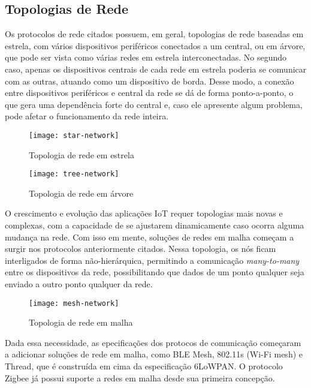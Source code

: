\documentclass[../monografia.tex]{subfiles}
\begin{document}
 
\subsection{Topologias de Rede}

Os protocolos de rede citados possuem, em geral, topologias de rede baseadas em estrela, com vários dispositivos periféricos conectados a um central, ou em árvore, que pode ser vista como várias redes em estrela interconectadas. No segundo caso, apenas os dispositivos centrais de cada rede em estrela poderia se comunicar com as outras, atuando como um dispositivo de borda. Desse modo, a conexão entre dispositivos periféricos e central da rede se dá de forma ponto-a-ponto, o que gera uma dependência forte do central e, caso ele apresente algum problema, pode afetar o funcionamento da rede inteira.

\begin{figure}[h!]
\centering
\begin{minipage}{.5\textwidth}
	\centering	
	\texttt{[image: star-network]}
	\caption{Topologia de rede em estrela}
	\label{fig:Rede em estrela}
\end{minipage}%
\begin{minipage}{.5\textwidth}
	\centering
	\texttt{[image: tree-network]}
	\caption{Topologia de rede em árvore}
	\label{fig:Rede em árvore}
\end{minipage}

\end{figure}


O crescimento e evolução das aplicações IoT requer topologias mais novas e complexas, com a capacidade de se ajustarem dinamicamente caso ocorra alguma mudança na rede. Com isso em mente, soluções de redes em malha começam a surgir nos protocolos anteriormente citados. Nessa topologia, os nós ficam interligados de forma não-hierárquica, permitindo a comunicação \textit{many-to-many} entre os dispositivos da rede, possibilitando que dados de um ponto qualquer seja enviado a outro ponto qualquer da rede. 


\begin{figure}[h!]
\centering
	\texttt{[image: mesh-network]}
	\caption{Topologia de rede em malha}
	\label{fig:Rede em malha}
\end{figure}

Dada essa necessidade, as epecificações dos protocos de comunicação começaram a adicionar soluções de rede em malha, como BLE Mesh, 802.11s (Wi-Fi mesh) e Thread, que é construída em cima da especificação 6LoWPAN. O protocolo Zigbee já possui suporte a redes em malha desde sua primeira concepção.
\end{document}
